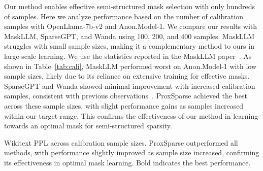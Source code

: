 Our method enables effective semi-structured mask selection with only hundreds of samples. Here we analyze performance based on the number of calibration samples with OpenLlama-7b-v2 and Anon.Model-1.
We compare our results with MaskLLM, SparseGPT, and Wanda using 100, 200, and 400 samples. MaskLLM struggles with small sample sizes, making it a complementary method to ours in large-scale learning. We use the statistics reported in the MaskLLM paper~\cite{fang2024maskllm}.
As shown in Table~\ref{tab:cali}, MaskLLM performed worst on Anon.Model-1 with low sample sizes, likely due to its reliance on extensive training for effective masks. SparseGPT and Wanda showed minimal improvement with increased calibration samples, consistent with previous observations~\cite{fang2024maskllm, sun2023simple}. 
ProxSparse achieved the best across these sample sizes, with slight performance gains as samples increased within our target range. This confirms the effectiveness of our method in learning towards an optimal mask for semi-structured sparsity.

\begin{table}[!t]
\centering
\caption{Wikitext PPL across calibration sample sizes. ProxSparse outperformed all methods, with performance slightly improved as sample size increased, confirming its effectiveness in optimal mask learning. Bold indicates the best performance.}
\vspace{0.5em}
\label{tab:cali}
\end{table}

